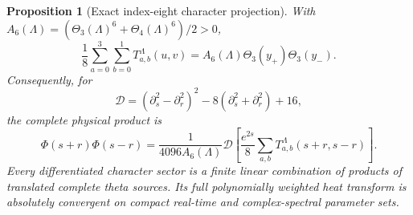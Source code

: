 \documentclass[11pt]{article}
\numberwithin{equation}{section}
\newtheorem{proposition}[theorem]{Proposition}
\theoremstyle{definition}
\theoremstyle{remark}
\begin{document}
\begin{proposition}[Exact index-eight character projection]
\label{sf:E8-projection}
With
\(A_6(\Lambda)=(\Theta_3(\Lambda)^6+\Theta_4(\Lambda)^6)/2>0\),
\begin{equation}
 \frac18\sum_{a=0}^3\sum_{b=0}^1T_{a,b}^{\Lambda}(u,v)
       =A_6(\Lambda)\Theta_3(y_+)\Theta_3(y_-).
 \label{sf:E8-theta}
\end{equation}
Consequently, for
\[
 \mathcal D=(\partial_s^2-\partial_r^2)^2
                    -8(\partial_s^2+\partial_r^2)+16,
\]
the complete physical product is
\begin{equation}
 \Phi(s+r)\Phi(s-r)=\frac1{4096A_6(\Lambda)}
 \mathcal D\left[\frac{e^{2s}}8\sum_{a,b}
                      T_{a,b}^{\Lambda}(s+r,s-r)\right].
 \label{sf:E8-source}
\end{equation}
Every differentiated character sector is a finite linear combination
of products of translated complete theta sources.  Its full
polynomially weighted heat transform is absolutely convergent on
compact real-time and complex-spectral parameter sets.
\end{proposition}
\end{document}
